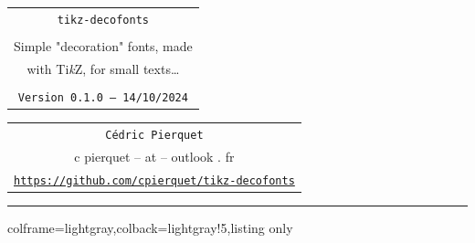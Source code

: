 \documentclass[11pt,a4paper]{ltxdoc}
\def\TPversion{0.1.0}
\def\TPdate{14/10/2024}
\begin{document}
\thispagestyle{empty}

\begin{center}
	\begin{minipage}{0.88\linewidth}
		\begin{tcolorbox}[colframe=yellow,colback=yellow!15]
			\begin{center}
				\renewcommand{\arraystretch}{1.25}%
				\begin{tabular}{c}
					{\Huge \texttt{tikz-decofonts}}\\
					\\
					{\LARGE Simple "decoration" fonts, made} \\
					{\LARGE with Ti\textit{k}Z, for small texts\ldots} \\
					\\
					{\small \texttt{Version \TPversion{} -- \TPdate}}
				\end{tabular}
			\end{center}
		\end{tcolorbox}
	\end{minipage}
\end{center}

\begin{center}
	\begin{tabular}{c}
		\texttt{Cédric Pierquet}\\
		{\ttfamily c pierquet -- at -- outlook . fr}\\
		\texttt{\url{https://github.com/cpierquet/tikz-decofonts}} \\
	\end{tabular}
\end{center}

\hrule

\vfill

\begin{tcblisting}{colframe=lightgray,colback=lightgray!5,listing only}


\end{tcblisting}

\begin{tcolorbox}[colframe=lightgray,colback=lightgray!5]
\end{tcolorbox}

\begin{tcolorbox}[colframe=lightgray,colback=lightgray!5]
\hfill{}\hfill~
\end{tcolorbox}
\end{document}
